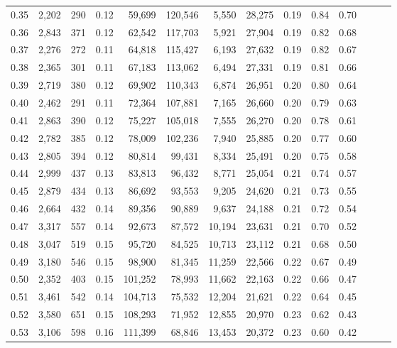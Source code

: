 \begin{tabular}{rrrrrrrrrrrrrr}
0.35 &  2,202 &  290 &  0.12 &   59,699 &  120,546 &   5,550 &  28,275 &  0.19 &  0.84 &      0.70 \\
0.36 &  2,843 &  371 &  0.12 &   62,542 &  117,703 &   5,921 &  27,904 &  0.19 &  0.82 &      0.68 \\
0.37 &  2,276 &  272 &  0.11 &   64,818 &  115,427 &   6,193 &  27,632 &  0.19 &  0.82 &      0.67 \\
0.38 &  2,365 &  301 &  0.11 &   67,183 &  113,062 &   6,494 &  27,331 &  0.19 &  0.81 &      0.66 \\
0.39 &  2,719 &  380 &  0.12 &   69,902 &  110,343 &   6,874 &  26,951 &  0.20 &  0.80 &      0.64 \\
0.40 &  2,462 &  291 &  0.11 &   72,364 &  107,881 &   7,165 &  26,660 &  0.20 &  0.79 &      0.63 \\
0.41 &  2,863 &  390 &  0.12 &   75,227 &  105,018 &   7,555 &  26,270 &  0.20 &  0.78 &      0.61 \\
0.42 &  2,782 &  385 &  0.12 &   78,009 &  102,236 &   7,940 &  25,885 &  0.20 &  0.77 &      0.60 \\
0.43 &  2,805 &  394 &  0.12 &   80,814 &   99,431 &   8,334 &  25,491 &  0.20 &  0.75 &      0.58 \\
0.44 &  2,999 &  437 &  0.13 &   83,813 &   96,432 &   8,771 &  25,054 &  0.21 &  0.74 &      0.57 \\
0.45 &  2,879 &  434 &  0.13 &   86,692 &   93,553 &   9,205 &  24,620 &  0.21 &  0.73 &      0.55 \\
0.46 &  2,664 &  432 &  0.14 &   89,356 &   90,889 &   9,637 &  24,188 &  0.21 &  0.72 &      0.54 \\
0.47 &  3,317 &  557 &  0.14 &   92,673 &   87,572 &  10,194 &  23,631 &  0.21 &  0.70 &      0.52 \\
0.48 &  3,047 &  519 &  0.15 &   95,720 &   84,525 &  10,713 &  23,112 &  0.21 &  0.68 &      0.50 \\
0.49 &  3,180 &  546 &  0.15 &   98,900 &   81,345 &  11,259 &  22,566 &  0.22 &  0.67 &      0.49 \\
0.50 &  2,352 &  403 &  0.15 &  101,252 &   78,993 &  11,662 &  22,163 &  0.22 &  0.66 &      0.47 \\
0.51 &  3,461 &  542 &  0.14 &  104,713 &   75,532 &  12,204 &  21,621 &  0.22 &  0.64 &      0.45 \\
0.52 &  3,580 &  651 &  0.15 &  108,293 &   71,952 &  12,855 &  20,970 &  0.23 &  0.62 &      0.43 \\
0.53 &  3,106 &  598 &  0.16 &  111,399 &   68,846 &  13,453 &  20,372 &  0.23 &  0.60 &      0.42 \\

\end{tabular}
